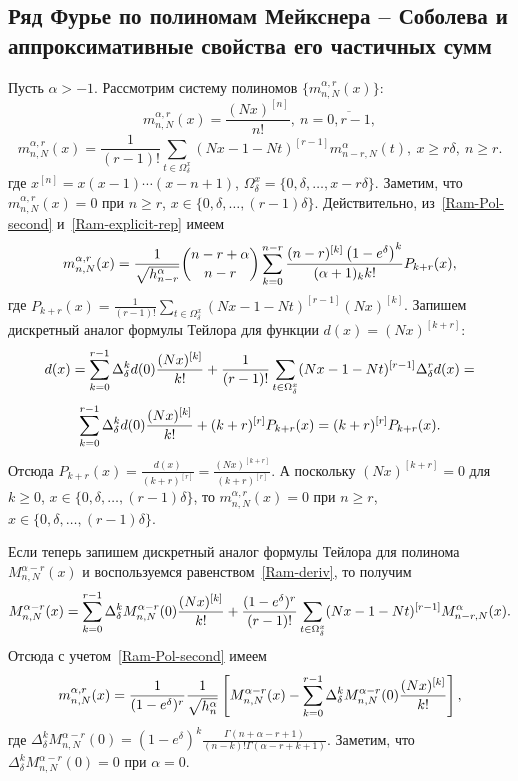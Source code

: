 \subsection{Ряд Фурье по полиномам Мейкснера -- Соболева и аппроксимативные свойства его частичных сумм}

Пусть $\alpha>-1$. Рассмотрим систему полиномов $\{m_{n,N}^{\alpha,r}(x)\}$:
\begin{equation*}
m_{n,N}^{\alpha,r}(x)=\frac{(Nx)^{[n]}}{n!},\ n=\overline{0,r-1},
\end{equation*}
\begin{equation}\label{Ram-Pol-second}
m_{n,N}^{\alpha,r}(x)=
\frac{1}{(r-1)!}\sum\limits_{t\in \Omega_\delta^x}(Nx-1-Nt)^{[r-1]}m_{n-r,N}^\alpha(t),\ x\ge r\delta,\ n\ge r.
\end{equation}
где $x^{[n]}=x(x-1)\cdots(x-n+1)$, $\Omega_\delta^x=\{0, \delta, \ldots, x-r\delta\}$. Заметим, что $m_{n,N}^{\alpha,r}(x)=0$ при $n\ge r$, $x\in\{0, \delta, \ldots, (r-1)\delta\}$. Действительно, из~\eqref{Ram-Pol-second} и~\eqref{Ram-explicit-rep} имеем
$$
m_{n,N}^{\alpha,r}(x)=\frac{1}{\sqrt{h_{n-r}^\alpha}}
{n-r+\alpha\choose n-r}\sum_{k=0}^{n-r}{(n-r)^{[k]}\left(1-e^\delta\right)^k\over(\alpha+1)_kk!}P_{k+r}(x),
$$
где $P_{k+r}(x)=\frac{1}{(r-1)!}\sum\limits_{t\in \Omega_\delta^x}(Nx-1-Nt)^{[r-1]}(Nx)^{[k]}$. Запишем дискретный аналог формулы Тейлора для функции $d(x)=(Nx)^{[k+r]}$:
$$
d(x)=\sum_{k=0}^{r-1}\Delta_\delta^kd(0){(Nx)^{[k]}\over k!}+\frac{1}{(r-1)!}\sum\limits_{t\in \Omega_\delta^x}(Nx-1-Nt)^{[r-1]}\Delta^r_\delta d(x)=
$$
$$
\sum_{k=0}^{r-1}\Delta_\delta^kd(0){(Nx)^{[k]}\over k!}+(k+r)^{[r]}P_{k+r}(x)=(k+r)^{[r]}P_{k+r}(x).
$$
Отсюда $P_{k+r}(x)=\frac{d(x)}{(k+r)^{[r]}}=\frac{(Nx)^{[k+r]}}{(k+r)^{[r]}}$. А поскольку $(Nx)^{[k+r]}=0$ для $k\ge0$, $x\in\{0, \delta, \ldots, (r-1)\delta\}$, то $m_{n,N}^{\alpha,r}(x)=0$ при $n\ge r$, $x\in\{0, \delta, \ldots, (r-1)\delta\}$.

Если теперь запишем дискретный аналог формулы Тейлора для полинома $M_{n,N}^{\alpha-r}(x)$ и воспользуемся равенством~\eqref{Ram-deriv}, то получим
$$
M_{n,N}^{\alpha-r}(x)=\sum_{k=0}^{r-1}\Delta_\delta^kM_{n,N}^{\alpha-r}(0){(Nx)^{[k]}\over k!}+
\frac{(1-e^\delta)^r}{(r-1)!}\sum\limits_{t\in \Omega_\delta^x}(Nx-1-Nt)^{[r-1]}M_{n-r,N}^{\alpha}(x).
$$
Отсюда с учетом~\eqref{Ram-Pol-second} имеем
\begin{equation}\label{Ram-rep-alpha-r}
m_{n,N}^{\alpha,r}(x)= \frac{1}{(1-e^\delta)^r}\frac{1}{\sqrt{h_{n}^{\alpha}}}\left[M_{n,N}^{\alpha-r}(x)-\sum_{k=0}^{r-1}\Delta_\delta^kM_{n,N}^{\alpha-r}(0){(Nx)^{[k]}\over k!}\right],
\end{equation}
где $\Delta^k_\delta M_{n,N}^{\alpha-r}(0)=(1-e^\delta)^k\frac{\Gamma(n+\alpha-r+1)}{(n-k)!\Gamma(\alpha-r+k+1)}$. Заметим, что $\Delta^k_\delta M_{n,N}^{\alpha-r}(0)=0$ при $\alpha=0$.

